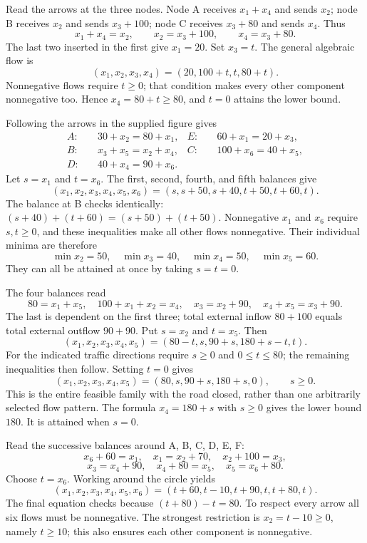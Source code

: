 Read the arrows at the three nodes. Node A receives $x_1+x_4$
and sends $x_2$; node B receives $x_2$ and sends $x_3+100$;
node C receives $x_3+80$ and sends $x_4$. Thus
\[x_1+x_4=x_2,\qquad x_2=x_3+100,\qquad x_4=x_3+80.\]
The last two inserted in the first give $x_1=20$.
Set $x_3=t$. The general algebraic flow is
\[(x_1,x_2,x_3,x_4)=(20,100+t,t,80+t).\]
Nonnegative flows require $t\ge0$; that condition makes every
other component nonnegative too. Hence $x_4=80+t\ge80$, and
$t=0$ attains the lower bound.

Following the arrows in the supplied figure gives
\begin{align*}
A:&\quad30+x_2=80+x_1,&E:&\quad60+x_1=20+x_3,\\
B:&\quad x_3+x_5=x_2+x_4,&C:&\quad100+x_6=40+x_5,\\
D:&\quad40+x_4=90+x_6.
\end{align*}
Let $s=x_1$ and $t=x_6$. The first, second, fourth, and fifth
balances give
\[(x_1,x_2,x_3,x_4,x_5,x_6)
=(s,s+50,s+40,t+50,t+60,t).\]
The balance at B checks identically:
$(s+40)+(t+60)=(s+50)+(t+50)$.
Nonnegative $x_1$ and $x_6$ require $s,t\ge0$, and these inequalities
make all other flows nonnegative. Their individual minima are therefore
\[\min x_2=50,\quad\min x_3=40,\quad
\min x_4=50,\quad\min x_5=60.\]
They can all be attained at once by taking $s=t=0$.

The four balances read
\[80=x_1+x_5,\quad100+x_1+x_2=x_4,\quad
x_3=x_2+90,\quad x_4+x_5=x_3+90.\]
The last is dependent on the first three; total external inflow
$80+100$ equals total external outflow $90+90$.
Put $s=x_2$ and $t=x_5$. Then
\[(x_1,x_2,x_3,x_4,x_5)=(80-t,s,90+s,180+s-t,t).\]
For the indicated traffic directions require $s\ge0$ and
$0\le t\le80$; the remaining inequalities then follow.
Setting $t=0$ gives
\[(x_1,x_2,x_3,x_4,x_5)=(80,s,90+s,180+s,0),\qquad s\ge0.\]
This is the entire feasible family with the road closed, rather than
one arbitrarily selected flow pattern.
The formula $x_4=180+s$ with $s\ge0$ gives the lower bound $180$.
It is attained when $s=0$.

Read the successive balances around A, B, C, D, E, F:
\[x_6+60=x_1,\quad x_1=x_2+70,\quad x_2+100=x_3,\]
\[x_3=x_4+90,\quad x_4+80=x_5,\quad x_5=x_6+80.\]
Choose $t=x_6$. Working around the circle yields
\[(x_1,x_2,x_3,x_4,x_5,x_6)
=(t+60,t-10,t+90,t,t+80,t).\]
The final equation checks because $(t+80)-t=80$.
To respect every arrow all six flows must be nonnegative. The
strongest restriction is $x_2=t-10\ge0$, namely $t\ge10$;
this also ensures each other component is nonnegative.
